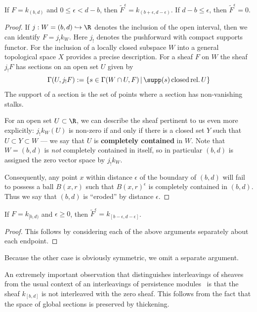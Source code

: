 \begin{prop}
If $F=k_{(b,d)}$ and $0\leq \epsilon < d-b$, then $\widetilde{F}^{\epsilon}=k_{(b+\epsilon,d-\epsilon)}$. If $d-b\leq \epsilon$, then $\widetilde{F}^{\epsilon}=0$.
\end{prop}
\begin{proof}
If $j:W=(b,d)\hookrightarrow \R$ denotes the inclusion of the open interval, then we can identify $F=j_! k_W$. Here $j_!$ denotes the pushforward with compact supports functor. For the inclusion of a locally closed subspace $W$ into a general topological space $X$ \cite{iversen} provides a precise description. For a sheaf $F$ on $W$ the sheaf $j_!F$ has sections on an open set $U$ given by
\[
\Gamma(U,j_!F):=\{s\in \Gamma(W\cap U,F) \,|\, \supp(s) \, \mathrm{closed}\,\mathrm{rel.}\, U\}
\]
The support of a section is the set of points where a section has non-vanishing stalks.

For an open set $U\subset\R$, we can describe the sheaf pertinent to us even more explicitly: $j_! k_W(U)$ is non-zero if and only if there is a closed set $Y$ such that $U\subset Y\subset W$ --- we say that $U$ is \textbf{completely contained} in $W$. Note that $W=(b,d)$ is \emph{not} completely contained in itself, so in particular $(b,d)$ is assigned the zero vector space by $j_!k_W$.

Consequently, any point $x$ within distance $\epsilon$ of the boundary of $(b,d)$ will fail to possess a ball $B(x,r)$ such that $B(x,r)^{\epsilon}$ is completely contained in $(b,d)$. Thus we say that $(b,d)$ is ``eroded'' by distance $\epsilon$.
\end{proof}

\begin{prop}
If $F=k_{[b,d)}$ and $\epsilon \geq 0$, then $\widetilde{F}^{\epsilon}=k_{[b-\epsilon,d-\epsilon]}$.
\end{prop}
\begin{proof}
This follows by considering each of the above arguments separately about each endpoint.
\end{proof}

Because the other case is obviously symmetric, we omit a separate argument.

An extremely important observation that distinguishes interleavings of sheaves from the usual context of an interleavings of persistence modules~\cite{bauer2013induced} is that the sheaf $k_{[b,d]}$ is not interleaved with the zero sheaf. This follows from the fact that the space of global sections is preserved by thickening.

